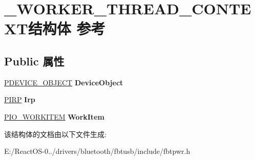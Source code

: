 \hypertarget{struct___w_o_r_k_e_r___t_h_r_e_a_d___c_o_n_t_e_x_t}{}\section{\+\_\+\+W\+O\+R\+K\+E\+R\+\_\+\+T\+H\+R\+E\+A\+D\+\_\+\+C\+O\+N\+T\+E\+X\+T结构体 参考}
\label{struct___w_o_r_k_e_r___t_h_r_e_a_d___c_o_n_t_e_x_t}
\subsection*{Public 属性}
\begin{DoxyCompactItemize}
\item 
\mbox{\label{struct___w_o_r_k_e_r___t_h_r_e_a_d___c_o_n_t_e_x_t_a8b0acda49a978e7eb6dc2e4e1d64e6f0}} 
\hyperlink{struct___d_e_v_i_c_e___o_b_j_e_c_t}{P\+D\+E\+V\+I\+C\+E\+\_\+\+O\+B\+J\+E\+CT} {\bfseries Device\+Object}
\item 
\mbox{\label{struct___w_o_r_k_e_r___t_h_r_e_a_d___c_o_n_t_e_x_t_ad89cd6bb4bf20051069bcb887e2d1149}} 
\hyperlink{interfacevoid}{P\+I\+RP} {\bfseries Irp}
\item 
\mbox{\label{struct___w_o_r_k_e_r___t_h_r_e_a_d___c_o_n_t_e_x_t_abd865385e70f16df402854a3f76cf000}} 
\hyperlink{struct___i_o___w_o_r_k_i_t_e_m}{P\+I\+O\+\_\+\+W\+O\+R\+K\+I\+T\+EM} {\bfseries Work\+Item}
\end{DoxyCompactItemize}


该结构体的文档由以下文件生成\+:\begin{DoxyCompactItemize}
\item 
E\+:/\+React\+O\+S-\/0../drivers/bluetooth/fbtusb/include/fbtpwr.\+h\end{DoxyCompactItemize}
